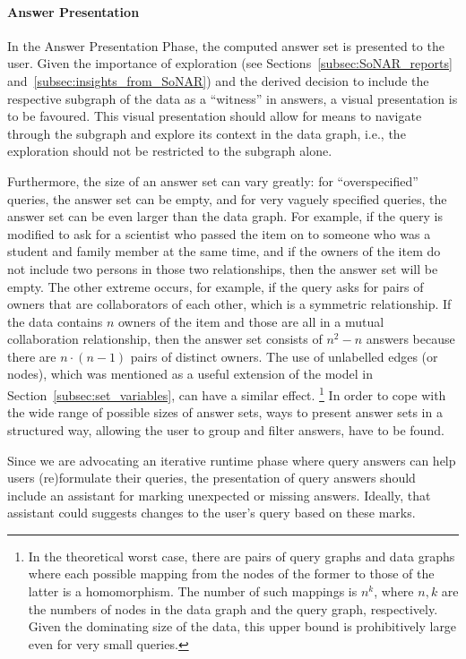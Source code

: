 \paragraph{Answer Presentation}

In the Answer Presentation Phase, the computed answer set is presented to the user.
Given the importance of exploration (see Sections~\ref{subsec:SoNAR_reports} and~\ref{subsec:insights_from_SoNAR})
and the derived decision to include the respective subgraph of the data as a \enquote{witness} in answers,
a visual presentation is to be favoured. This visual presentation should allow for means to navigate through the subgraph
and explore its context in the data graph, i.e., the exploration should not be restricted to the subgraph alone.

Furthermore, the size of an answer set can vary greatly: for \enquote{overspecified} queries, the answer set can be empty,
and for very vaguely specified queries, the answer set can be even larger than the data graph.
For example, if the query  is modified to ask for a scientist who passed the item on
to someone who was a student and family member at the same time, and if the owners of the item
do not include two persons in those two relationships, then the answer set will be empty.
The other extreme occurs, for example, if the query asks for pairs of owners that are collaborators of each other,
which is a symmetric relationship. If the data contains $n$ owners of the item and those are all in a mutual collaboration relationship,
then the answer set consists of $n^2 - n$ answers because there are $n \cdot (n-1)$ pairs of distinct owners.
The use of unlabelled edges (or nodes), which was mentioned as a useful extension of the model in Section~\ref{subsec:set_variables},
can have a similar effect.%
\footnote{%
  In the theoretical worst case, there are pairs of query graphs and data graphs
  where each possible mapping from the nodes of the former
  to those of the latter is a homomorphism. The number of such mappings is $n^k$,
  where $n,k$ are the numbers of nodes in the data graph and the query graph, respectively.
  Given the dominating size of the data, this upper bound is prohibitively large even for very small queries.%
}
In order to cope with the wide range of possible sizes of answer sets,
ways to present answer sets in a structured way,
allowing the user to group and filter answers, have to be found.

Since we are advocating an iterative runtime phase where query answers can help users (re)for\-mu\-late their queries,
the presentation of query answers should include an assistant for marking unexpected or missing answers.
Ideally, that assistant could suggests changes to the user's query based on these marks.

